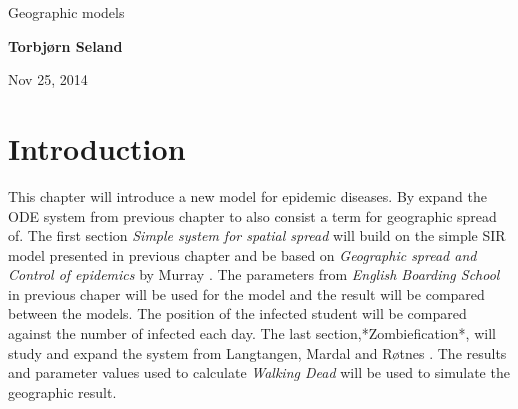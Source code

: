 \documentclass[%
twoside,                 %
final,                   %
10pt]{article}
\begin{document}






\thispagestyle{empty}

\begin{center}
{\LARGE\bf
\begin{spacing}{1.25}
Geographic models 
\end{spacing}
}
\end{center}


\begin{center}
{\bf Torbjørn Seland${}^{}$} \\ [0mm]
\end{center}

    \begin{center}
\end{center}


\begin{center}
Nov 25, 2014
\end{center}

\vspace{1cm}


\tableofcontents


\vspace{1cm} %




\section{Introduction}
This chapter will introduce a new model for epidemic diseases. By expand the ODE system from previous chapter to also consist a term for geographic spread of. The first section \emph{Simple system for spatial spread} will build on the simple SIR model presented in previous chapter and be based on \emph{Geographic spread and Control of epidemics} by Murray \cite{murray2003mathematical}. The parameters from \emph{English Boarding School} in previous chaper will be used for the model and the result will be compared between the models. The position of the infected student will be compared against the number of infected each day. The last section,*Zombiefication*, will study and expand the system from Langtangen, Mardal and Røtnes \cite{zombie-math}. The results and parameter values used to calculate \emph{Walking Dead} will be used to simulate the geographic result.
\end{document}
